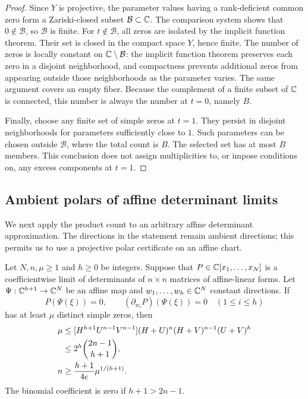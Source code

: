 \begin{proof}
Since $Y$ is projective, the parameter values having a rank-deficient
common zero form a Zariski-closed subset $\mathcal B\subset\mathbb C$.
The comparison system shows that $0\notin\mathcal B$, so $\mathcal B$
is finite. For $t\notin\mathcal B$, all zeros are isolated by the
implicit function theorem. Their set is closed in the compact space
$Y$, hence finite. The number of zeros is locally constant on
$\mathbb C\setminus\mathcal B$: the implicit function theorem preserves each
zero in a disjoint neighborhood, and compactness prevents additional
zeros from appearing outside those neighborhoods as the parameter varies.
The same argument covers an empty fiber. Because the complement of a
finite subset of $\mathbb C$ is connected, this number is always the number at
$t=0$, namely $B$.

Finally, choose any finite set of simple zeros at $t=1$. They persist in
disjoint neighborhoods for parameters sufficiently close to $1$. Such
parameters can be chosen outside $\mathcal B$, where the total count is
$B$. The selected set has at most $B$ members. This conclusion does not
assign multiplicities to, or impose conditions on, any excess components
at $t=1$.
\end{proof}

\subsection{Ambient polars of affine determinant limits}

We next apply the product count to an arbitrary affine determinant
approximation. The directions in the statement remain ambient directions;
this permits us to use a projective polar certificate on an affine chart.

\begin{proposition}\label{polar:ambient-bound}
Let $N,n,\mu\ge1$ and $h\ge0$ be integers. Suppose that
$P\in\mathbb C[x_1,\ldots,x_N]$ is a coefficientwise limit of determinants of
$n\times n$ matrices of affine-linear forms. Let
$\Psi:\mathbb C^{h+1}\to\mathbb C^N$ be an affine map and
$w_1,\ldots,w_h\in\mathbb C^N$ constant directions. If
\begin{equation}\label{polar:affine-certificate}
 P(\Psi(\xi))=0,\qquad
 (\partial_{w_i}P)(\Psi(\xi))=0\quad(1\le i\le h)
\end{equation}
has at least $\mu$ distinct simple zeros, then
\begin{align}
 \mu&\le [H^{h+1}U^{n-1}V^{n-1}]
            (H+U)^n(H+V)^{n-1}(U+V)^h\label{polar:ambient-coefficient}\\
  &\le 2^h\binom{2n-1}{h+1},\notag\\
 n&\ge\frac{h+1}{4e}\mu^{1/(h+1)}.\label{polar:ambient-size}
\end{align}
The binomial coefficient is zero if $h+1>2n-1$.
\end{proposition}

